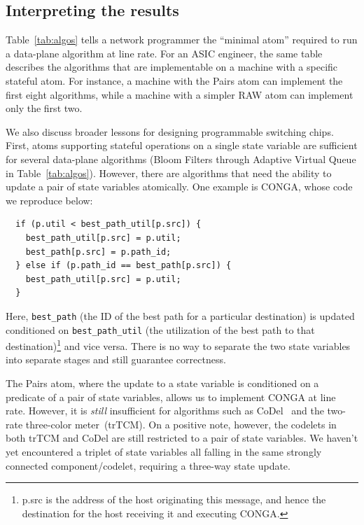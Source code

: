 \subsection{Interpreting the results}
Table~\ref{tab:algos} tells a network programmer the ``minimal atom'' required
to run a data-plane algorithm at line rate. For an ASIC engineer, the same
table describes the algorithms that are implementable on a \absmachine machine
with a specific stateful atom. For instance, a \absmachine machine with the
Pairs atom can implement the first eight algorithms, while a machine with a
simpler RAW atom can implement only the first two.

We also discuss broader lessons for designing programmable switching chips.
First, atoms supporting stateful operations on a single state variable are
sufficient for several data-plane algorithms (Bloom Filters through Adaptive
Virtual Queue in Table~\ref{tab:algos}). However, there are algorithms that
need the ability to update a pair of state variables atomically. One example is
CONGA, whose code we reproduce below:
\begin{verbatim}
  if (p.util < best_path_util[p.src]) {
    best_path_util[p.src] = p.util;
    best_path[p.src] = p.path_id;
  } else if (p.path_id == best_path[p.src]) {
    best_path_util[p.src] = p.util;
  }
\end{verbatim}
Here, \texttt{best\_path} (the ID of the best path for a particular
destination) is updated conditioned on \texttt{best\_path\_util} (the
utilization of the best path to that destination)\footnote{p.src is the address
  of the host originating this message, and hence the destination for the host
receiving it and executing CONGA.} and vice versa. There is no way to separate
the two state variables into separate stages and still guarantee correctness.

The Pairs atom, where the update to a state variable is conditioned on a
predicate of a pair of state variables, allows us to implement CONGA at line
rate.  However, it is \textit{still} insufficient for algorithms such as
CoDel~\cite{codel} and the two-rate three-color meter~\cite{trTCM}(trTCM).  On
a positive note, however, the codelets in both trTCM and CoDel are still
restricted to a pair of state variables.  We haven't yet encountered a triplet
of state variables all falling in the same strongly connected
component/codelet, requiring a three-way state update.



